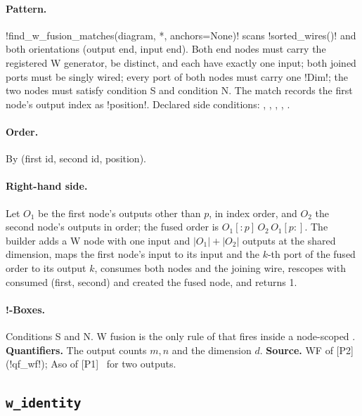 \paragraph{Pattern.} \py!find_w_fusion_matches(diagram, *, anchors=None)! scans \py!sorted_wires()! and both orientations (output end, input end). Both end nodes must carry the registered W generator, be distinct, and each have exactly one input; both joined ports must be singly wired; every port of both nodes must carry one \py!Dim!; the two nodes must satisfy condition S and condition N. The match records the first node's output index as \py!position!. Declared side conditions: , , , , .

\paragraph{Order.} By (first id, second id, position).

\paragraph{Right-hand side.} Let $O_1$ be the first node's outputs other than $p$, in index order, and $O_2$ the second node's outputs in order; the fused order is $O_1[{:}p]\,O_2\,O_1[p{:}]$. The builder adds a W node with one input and $|O_1|+|O_2|$ outputs at the shared dimension, maps the first node's input to its input and the $k$-th port of the fused order to its output $k$, consumes both nodes and the joining wire, rescopes with consumed (first, second) and created the fused node, and returns 1.

\paragraph{!-Boxes.} Conditions S and N. W fusion is the only rule of  that fires inside a node-scoped \bbox{}. \textbf{Quantifiers.} The output counts $m,n$ and the dimension $d$. \textbf{Source.} WF of [P2]~\cite{wang2023qufinitezxw} (\py!qf_wf!); Aso of [P1]~\cite{poor2023zxw} for two outputs.

\subsection{\texttt{w\_identity}}\label{sec:rules-w-identity}

